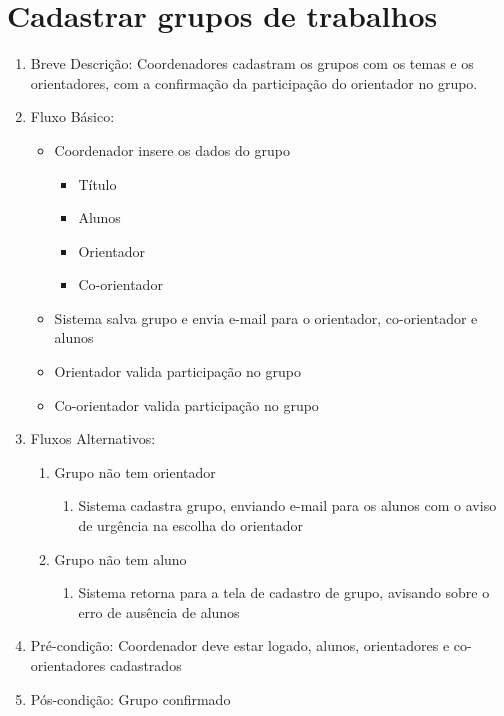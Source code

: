 \section{Cadastrar grupos de trabalhos}
\begin{enumerate}
    \item Breve Descrição: Coordenadores cadastram os grupos com os temas e os orientadores, com a confirmação da participação do orientador no grupo.
    \item Fluxo Básico:
    \begin{itemize}
        \item Coordenador insere os dados do grupo
        \begin{itemize}
            \item Título
            \item Alunos
            \item Orientador
            \item Co-orientador
        \end{itemize}
        \item Sistema salva grupo e envia e-mail para o orientador, co-orientador e alunos
        \item Orientador valida participação no grupo
        \item Co-orientador valida participação no grupo
    \end{itemize}
    \item Fluxos Alternativos:
    \begin{enumerate}
        \item Grupo não tem orientador
        \begin{enumerate}
            \item Sistema cadastra grupo, enviando e-mail para os alunos com o aviso de urgência na escolha do orientador
        \end{enumerate}
        \item Grupo não tem aluno
        \begin{enumerate}
            \item Sistema retorna para a tela de cadastro de grupo, avisando sobre o erro de ausência de alunos
        \end{enumerate}
    \end{enumerate}
    \item Pré-condição: Coordenador deve estar logado, alunos, orientadores e co-orientadores cadastrados
    \item Pós-condição: Grupo confirmado
\end{enumerate}

